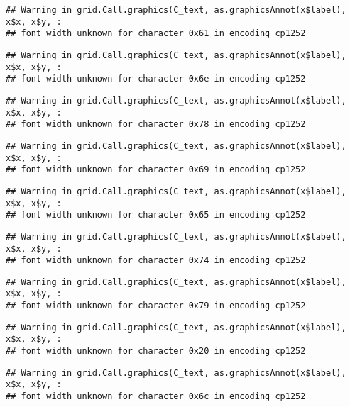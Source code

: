 \documentclass[
]{article}
\begin{document}
\begin{verbatim}
## Warning in grid.Call.graphics(C_text, as.graphicsAnnot(x$label), x$x, x$y, :
## font width unknown for character 0x61 in encoding cp1252
\end{verbatim}

\begin{verbatim}
## Warning in grid.Call.graphics(C_text, as.graphicsAnnot(x$label), x$x, x$y, :
## font width unknown for character 0x6e in encoding cp1252
\end{verbatim}

\begin{verbatim}
## Warning in grid.Call.graphics(C_text, as.graphicsAnnot(x$label), x$x, x$y, :
## font width unknown for character 0x78 in encoding cp1252
\end{verbatim}

\begin{verbatim}
## Warning in grid.Call.graphics(C_text, as.graphicsAnnot(x$label), x$x, x$y, :
## font width unknown for character 0x69 in encoding cp1252
\end{verbatim}

\begin{verbatim}
## Warning in grid.Call.graphics(C_text, as.graphicsAnnot(x$label), x$x, x$y, :
## font width unknown for character 0x65 in encoding cp1252
\end{verbatim}

\begin{verbatim}
## Warning in grid.Call.graphics(C_text, as.graphicsAnnot(x$label), x$x, x$y, :
## font width unknown for character 0x74 in encoding cp1252
\end{verbatim}

\begin{verbatim}
## Warning in grid.Call.graphics(C_text, as.graphicsAnnot(x$label), x$x, x$y, :
## font width unknown for character 0x79 in encoding cp1252
\end{verbatim}

\begin{verbatim}
## Warning in grid.Call.graphics(C_text, as.graphicsAnnot(x$label), x$x, x$y, :
## font width unknown for character 0x20 in encoding cp1252
\end{verbatim}

\begin{verbatim}
## Warning in grid.Call.graphics(C_text, as.graphicsAnnot(x$label), x$x, x$y, :
## font width unknown for character 0x6c in encoding cp1252
\end{verbatim}
\end{document}
